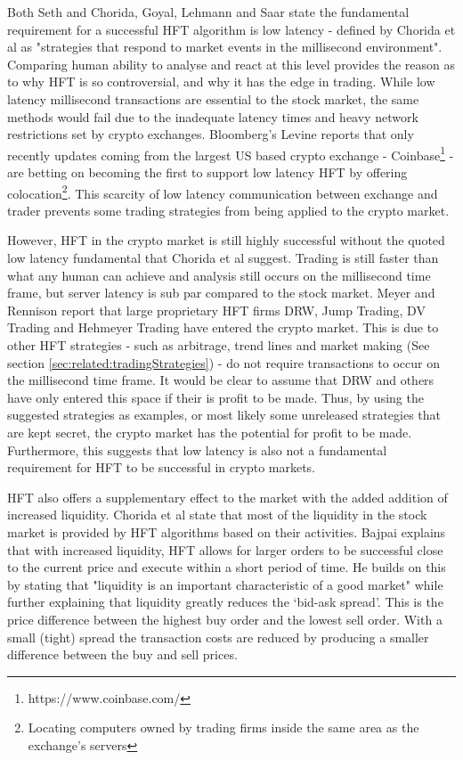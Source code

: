 Both Seth \cite{WEB:SETH:0001} and Chorida, Goyal, Lehmann and Saar \cite{REPORT:ChordiaEtAl:2013} state the fundamental requirement for a successful HFT algorithm is low latency - defined by Chorida et al as "strategies that respond to market events in the millisecond environment". Comparing human ability to analyse and react at this level provides the reason as to why HFT is so controversial, and why it has the edge in trading. While low latency millisecond transactions are essential to the stock market, the same methods would fail due to the inadequate latency times and heavy network restrictions set by crypto exchanges. Bloomberg's Levine reports \cite{WEB:Levine:2018} that only recently updates coming from the largest US based crypto exchange - Coinbase\footnote{https://www.coinbase.com/} - are betting on becoming the first to support low latency HFT by offering colocation\footnote{Locating computers owned by trading firms inside the same area as the exchange's servers}. This scarcity of low latency communication between exchange and trader prevents some trading strategies from being applied to the crypto market. 

However, HFT in the crypto market is still highly successful without the quoted low latency fundamental that Chorida et al suggest. Trading is still faster than what any human can achieve and analysis still occurs on the millisecond time frame, but server latency is sub par compared to the stock market. Meyer and Rennison \cite{ART:Meyer:2017} report that large proprietary HFT firms DRW, Jump Trading, DV Trading and Hehmeyer Trading have entered the crypto market. This is due to other HFT strategies - such as arbitrage, trend lines and market making (See section \ref{sec:related:tradingStrategies}) - do not require  transactions to occur on the millisecond time frame. It would be clear to assume that DRW and others have only entered this space if their is profit to be made. Thus, by using the suggested strategies as examples, or most likely some unreleased strategies that are kept secret, the crypto market has the potential for profit to be made. Furthermore, this suggests that low latency is also not a fundamental requirement for HFT to be successful in crypto markets.

\noindent HFT also offers a supplementary effect to the market with the added addition of increased liquidity. Chorida et al \cite{REPORT:ChordiaEtAl:2013} state that most of the liquidity in the stock market is provided by HFT algorithms based on their activities. Bajpai \cite{WEB:Bajpai:0001} explains that with increased liquidity, HFT allows for larger orders to be successful close to the current price and execute within a short period of time. He builds on this by stating that "liquidity is an important characteristic of a good market" while further explaining that liquidity greatly reduces the `bid-ask spread'. This is the price difference between the highest buy order and the lowest sell order. With a small (tight) spread the transaction costs are reduced by producing a smaller difference between the buy and sell prices. 

